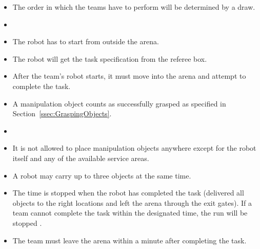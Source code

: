 \begin{itemize}
\item The order in which the teams have to perform will be determined by a draw.
\item {}
\item The robot has to start from outside the arena.
\item The robot will get the task specification from the referee box.
\item After the team's robot starts, it must move into the arena and attempt to complete the task. 
\item A manipulation object counts as successfully grasped as specified in Section~\ref{ssec:GraspingObjects}.
\item {}
\item It is not allowed to place manipulation objects anywhere except for the robot itself and any of the available service areas.
\item A robot may carry up to three objects at the same time.
\item The time is stopped when the robot has completed the task (delivered all objects to the right locations and left the arena through the exit gates). If a team cannot complete the task within  the designated time, the run will be stopped . 
\item The team must leave the arena within a minute after completing the task.
\end{itemize}


%
%
%
